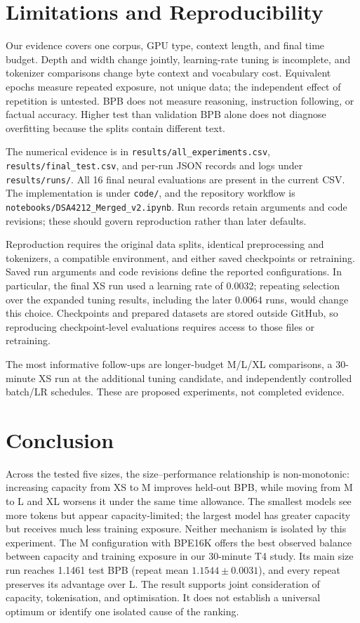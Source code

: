 \documentclass[11pt]{article}
\begin{document}
\section{Limitations and Reproducibility}
Our evidence covers one corpus, GPU type, context length, and final time budget. Depth and width change jointly, learning-rate tuning is incomplete, and tokenizer comparisons change byte context and vocabulary cost. Equivalent epochs measure repeated exposure, not unique data; the independent effect of repetition is untested. BPB does not measure reasoning, instruction following, or factual accuracy. Higher test than validation BPB alone does not diagnose overfitting because the splits contain different text.

The numerical evidence is in \texttt{results/\allowbreak all\_\allowbreak experiments.csv}, \texttt{results/\allowbreak final\_\allowbreak test.csv}, and per-run JSON records and logs under \texttt{results/\allowbreak runs/}. All 16 final neural evaluations are present in the current CSV. The implementation is under \texttt{code/}, and the repository workflow is \texttt{notebooks/\allowbreak DSA4212\_\allowbreak Merged\_\allowbreak v2.ipynb}. Run records retain arguments and code revisions; these should govern reproduction rather than later defaults.

Reproduction requires the original data splits, identical
preprocessing and tokenizers, a compatible environment, and
either saved checkpoints or retraining. Saved run arguments
and code revisions define the reported configurations.
In particular, the final XS run used a learning rate of
0.0032; repeating selection over the expanded tuning results,
including the later 0.0064 runs, would change this choice.
Checkpoints and prepared datasets are stored outside GitHub,
so reproducing checkpoint-level evaluations requires access
to those files or retraining.

The most informative follow-ups are longer-budget M/L/XL comparisons, a 30-minute XS run at the additional tuning candidate, and independently controlled batch/LR schedules. These are proposed experiments, not completed evidence.

\section{Conclusion}
Across the tested five sizes, the size--performance relationship is non-monotonic: increasing capacity from XS to M improves held-out BPB, while moving from M to L and XL worsens it under the same time allowance. The smallest models see more tokens but appear capacity-limited; the largest model has greater capacity but receives much less training exposure. Neither mechanism is isolated by this experiment. The M configuration with BPE16K offers the best observed balance between capacity and training exposure in our 30-minute T4 study. Its main size run reaches 1.1461 test BPB (repeat mean $1.1544\pm0.0031$), and every repeat preserves its advantage over L. The result supports joint consideration of capacity, tokenisation, and optimisation. It does not establish a universal optimum or identify one isolated cause of the ranking.
\end{document}
